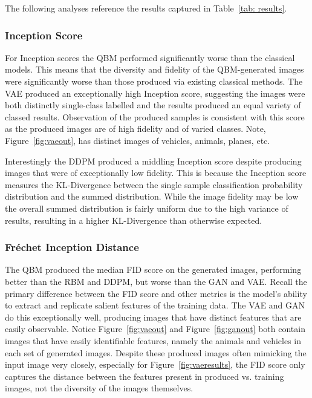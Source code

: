 \documentclass[%
 reprint,
 amsmath,amssymb,
 aps,
]{revtex4-2}
\begin{document}
The following analyses reference the results captured in Table~\ref{tab: results}.

\subsubsection{Inception Score}
For Inception scores the QBM performed significantly worse than the classical models. This means that the diversity and fidelity of the QBM-generated images were significantly worse than those produced via existing classical methods. The VAE produced an exceptionally high Inception score, suggesting the images were both distinctly single-class labelled and the results produced an equal variety of classed results. Observation of the produced samples is consistent with this score as the produced images are of high fidelity and of varied classes. Note, Figure~\ref{fig:vaeout}, has distinct images of vehicles, animals, planes, etc.


Interestingly the DDPM produced a middling Inception score despite producing images that were of exceptionally low fidelity. This is because the Inception score measures the KL-Divergence between the single sample classification probability distribution and the summed distribution. While the image fidelity may be low the overall summed distribution is fairly uniform due to the high variance of results, resulting in a higher KL-Divergence than otherwise expected.

\subsubsection{Fréchet Inception Distance}
The QBM produced the median FID score on the generated images, performing better than the RBM and DDPM, but worse than the GAN and VAE. Recall the primary difference between the FID score and other metrics is the model's ability to extract and replicate salient features of the training data. The VAE and GAN do this exceptionally well, producing images that have distinct features that are easily observable. Notice Figure~\ref{fig:vaeout} and Figure~\ref{fig:ganout} both contain images that have easily identifiable features, namely the animals and vehicles in each set of generated images. Despite these produced images often mimicking the input image very closely, especially for Figure~\ref{fig:vaeresults}, the FID score only captures the distance between the features present in produced vs. training images, not the diversity of the images themselves.
\end{document}
